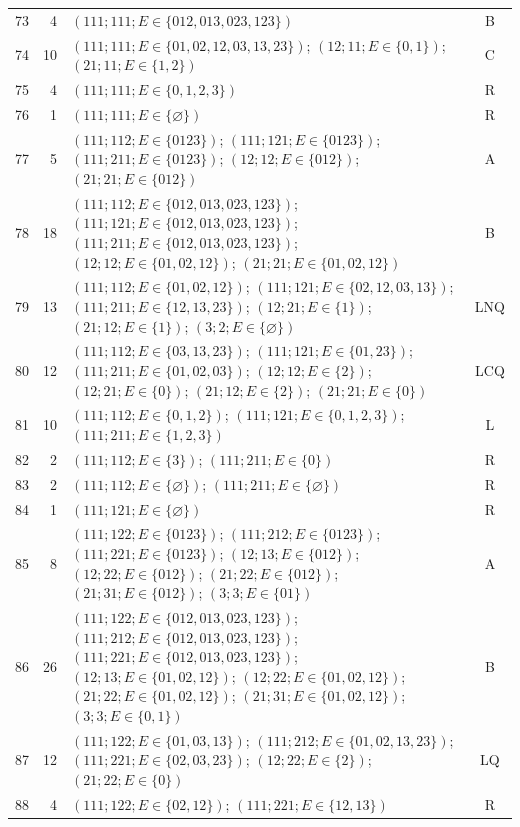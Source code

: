 \begin{longtable}{@{}r r p{10.1cm} c@{}}
73 & 4 & $(111;111;E\in\{012,013,023,123\})$ & B\\[1mm]
74 & 10 & $(111;111;E\in\{01,02,12,03,13,23\})$; $(12;11;E\in\{0,1\})$; $(21;11;E\in\{1,2\})$ & C\\[1mm]
75 & 4 & $(111;111;E\in\{0,1,2,3\})$ & R\\[1mm]
76 & 1 & $(111;111;E\in\{\varnothing\})$ & R\\[1mm]
77 & 5 & $(111;112;E\in\{0123\})$; $(111;121;E\in\{0123\})$; $(111;211;E\in\{0123\})$; $(12;12;E\in\{012\})$; $(21;21;E\in\{012\})$ & A\\[1mm]
78 & 18 & $(111;112;E\in\{012,013,023,123\})$; $(111;121;E\in\{012,013,023,123\})$; $(111;211;E\in\{012,013,023,123\})$; $(12;12;E\in\{01,02,12\})$; $(21;21;E\in\{01,02,12\})$ & B\\[1mm]
79 & 13 & $(111;112;E\in\{01,02,12\})$; $(111;121;E\in\{02,12,03,13\})$; $(111;211;E\in\{12,13,23\})$; $(12;21;E\in\{1\})$; $(21;12;E\in\{1\})$; $(3;2;E\in\{\varnothing\})$ & LNQ\\[1mm]
80 & 12 & $(111;112;E\in\{03,13,23\})$; $(111;121;E\in\{01,23\})$; $(111;211;E\in\{01,02,03\})$; $(12;12;E\in\{2\})$; $(12;21;E\in\{0\})$; $(21;12;E\in\{2\})$; $(21;21;E\in\{0\})$ & LCQ\\[1mm]
81 & 10 & $(111;112;E\in\{0,1,2\})$; $(111;121;E\in\{0,1,2,3\})$; $(111;211;E\in\{1,2,3\})$ & L\\[1mm]
82 & 2 & $(111;112;E\in\{3\})$; $(111;211;E\in\{0\})$ & R\\[1mm]
83 & 2 & $(111;112;E\in\{\varnothing\})$; $(111;211;E\in\{\varnothing\})$ & R\\[1mm]
84 & 1 & $(111;121;E\in\{\varnothing\})$ & R\\[1mm]
85 & 8 & $(111;122;E\in\{0123\})$; $(111;212;E\in\{0123\})$; $(111;221;E\in\{0123\})$; $(12;13;E\in\{012\})$; $(12;22;E\in\{012\})$; $(21;22;E\in\{012\})$; $(21;31;E\in\{012\})$; $(3;3;E\in\{01\})$ & A\\[1mm]
86 & 26 & $(111;122;E\in\{012,013,023,123\})$; $(111;212;E\in\{012,013,023,123\})$; $(111;221;E\in\{012,013,023,123\})$; $(12;13;E\in\{01,02,12\})$; $(12;22;E\in\{01,02,12\})$; $(21;22;E\in\{01,02,12\})$; $(21;31;E\in\{01,02,12\})$; $(3;3;E\in\{0,1\})$ & B\\[1mm]
87 & 12 & $(111;122;E\in\{01,03,13\})$; $(111;212;E\in\{01,02,13,23\})$; $(111;221;E\in\{02,03,23\})$; $(12;22;E\in\{2\})$; $(21;22;E\in\{0\})$ & LQ\\[1mm]
88 & 4 & $(111;122;E\in\{02,12\})$; $(111;221;E\in\{12,13\})$ & R\\[1mm]

\end{longtable}
